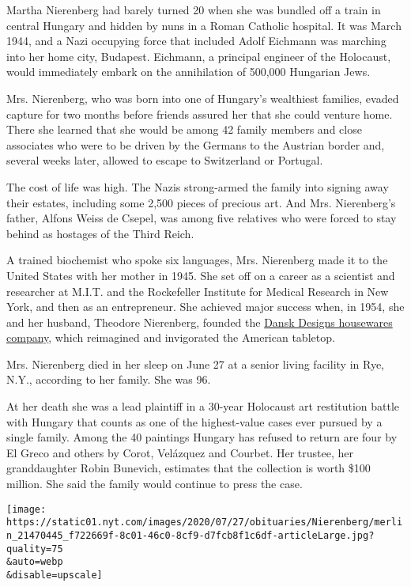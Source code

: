 Martha Nierenberg had barely turned 20 when she was bundled off a train
in central Hungary and hidden by nuns in a Roman Catholic hospital. It
was March 1944, and a Nazi occupying force that included Adolf Eichmann
was marching into her home city, Budapest. Eichmann, a principal
engineer of the Holocaust, would immediately embark on the annihilation
of 500,000 Hungarian Jews.

Mrs. Nierenberg, who was born into one of Hungary's wealthiest families,
evaded capture for two months before friends assured her that she could
venture home. There she learned that she would be among 42 family
members and close associates who were to be driven by the Germans to the
Austrian border and, several weeks later, allowed to escape to
Switzerland or Portugal.

The cost of life was high. The Nazis strong-armed the family into
signing away their estates, including some 2,500 pieces of precious art.
And Mrs. Nierenberg's father, Alfons Weiss de Csepel, was among five
relatives who were forced to stay behind as hostages of the Third Reich.

A trained biochemist who spoke six languages, Mrs. Nierenberg made it to
the United States with her mother in 1945. She set off on a career as a
scientist and researcher at M.I.T. and the Rockefeller Institute for
Medical Research in New York, and then as an entrepreneur. She achieved
major success when, in 1954, she and her husband, Theodore Nierenberg,
founded the
\href{https://designresearch.sva.edu/research/dansk-designs-reinventing-the-american-tabletop-1954-1985/}{Dansk
Designs housewares company}, which reimagined and invigorated the
American tabletop.

Mrs. Nierenberg died in her sleep on June 27 at a senior living facility
in Rye, N.Y., according to her family. She was 96.

At her death she was a lead plaintiff in a 30-year Holocaust art
restitution battle with Hungary that counts as one of the highest-value
cases ever pursued by a single family. Among the 40 paintings Hungary
has refused to return are four by El Greco and others by Corot,
Velázquez and Courbet. Her trustee, her granddaughter Robin Bunevich,
estimates that the collection is worth \$100 million. She said the
family would continue to press the case.

\texttt{[image: https://static01.nyt.com/images/2020/07/27/obituaries/Nierenberg/merlin\_21470445\_f722669f-8c01-46c0-8cf9-d7fcb8f1c6df-articleLarge.jpg?quality=75\\\&auto=webp\\\&disable=upscale]}


